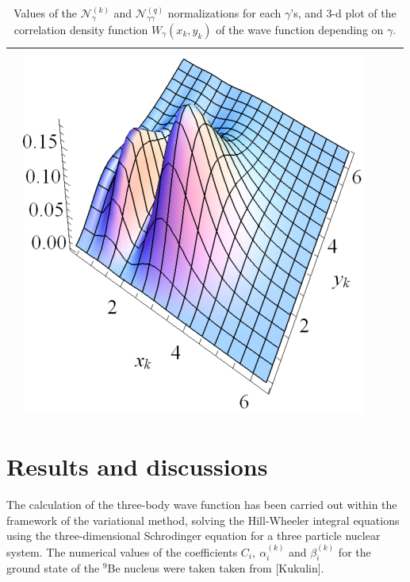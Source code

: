 \documentclass[12pt,a4paper,twoside]{article}
\begin{document}
\begin{table}[]
\begin{tabular}{@{}ccccc@{}}
&\includegraphics[scale=0.5]{W1_all}                  
\\ \bottomrule
\end{tabular}
\caption{Values of the $\mathcal{N}_{\gamma}^{(k)}$ and  $\mathcal{N}_{\gamma \gamma}^{(q)}$ normalizations for each $\gamma$'s, and 3-d plot of the correlation density function $W_{\gamma}\left(x_k,y_k\right)$ of the wave function depending on $\gamma$.}
\label{table:atable}
\end{table}






\section*{Results and discussions}

The calculation of the three-body wave function has been carried out within the framework of the variational method, solving the Hill-Wheeler integral equations using the three-dimensional Schrodinger equation for a three particle nuclear system.
The numerical values of the coefficients $C_i,~\alpha^{(k)}_i$ and $\beta^{(k)}_i$ for the ground state of the $^9$Be nucleus were taken taken  from [Kukulin].
\end{document}
